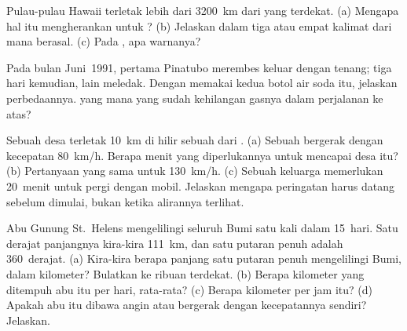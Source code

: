 \begin{exercise}[$\star\star$]\label{exo:g7:volcanoes:9}
Pulau-pulau Hawaii terletak lebih dari \qty{3200}{km} dari 
yang terdekat. (a) Mengapa hal itu mengherankan untuk ?
(b) Jelaskan dalam tiga atau empat kalimat dari mana  berasal.
(c) Pada  , apa warnanya?
\end{exercise}

\begin{exercise}[$\star\star$]\label{exo:g7:volcanoes:10}
Pada bulan Juni~1991,  pertama Pinatubo merembes keluar dengan tenang;
tiga hari kemudian,  lain meledak. Dengan memakai kedua botol air soda
itu, jelaskan perbedaannya.  yang mana yang sudah kehilangan gasnya
dalam perjalanan ke atas?
\end{exercise}

\begin{exercise}[$\star\star\star$]\label{exo:g7:volcanoes:11}
Sebuah desa terletak \qty{10}{km} di hilir sebuah  dari .
(a) Sebuah  bergerak dengan kecepatan \qty{80}{km/h}.
Berapa menit yang diperlukannya untuk mencapai desa itu? (b) Pertanyaan
yang sama untuk \qty{130}{km/h}. (c) Sebuah keluarga memerlukan
20~menit untuk pergi dengan mobil. Jelaskan mengapa peringatan harus datang
sebelum  dimulai, bukan ketika alirannya terlihat.
\end{exercise}

\begin{exercise}[$\star\star\star$]\label{exo:g7:volcanoes:12}
Abu Gunung St.~Helens mengelilingi seluruh Bumi satu kali dalam 15~hari.
Satu derajat  panjangnya kira-kira \qty{111}{km}, dan satu putaran
penuh adalah 360~derajat. (a) Kira-kira berapa panjang satu putaran penuh
mengelilingi Bumi, dalam kilometer? Bulatkan ke ribuan terdekat. (b) Berapa
kilometer yang ditempuh abu itu per hari, rata-rata? (c) Berapa kilometer
per jam itu? (d) Apakah abu itu dibawa angin atau bergerak dengan
kecepatannya sendiri? Jelaskan.
\end{exercise}

